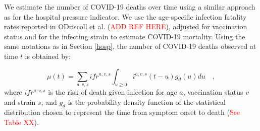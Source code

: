 We estimate the number of COVID-19 deaths over time using a similar approach 
as for the hospital pressure indicator. We use the age-specific infection fatality rates reported in
ODriscoll et al. (\textcolor{red}{ADD REF HERE}), adjusted for vaccination status and for the infecting strain
to estimate COVID-19 mortality. Using the same notations as in Section \ref{hosp}, the number of COVID-19
deaths observed at time $t$ is obtained by:

$$ \mu(t) = \sum_{a,v,s} ifr^{a,v,s} \int_{u \geq 0}  i^{a,v,s}(t-u)g_{d}(u) du   \quad, $$
where $ifr^{a,v,s}$ is the risk of death given infection for age $a$, vaccination status $v$ and strain $s$, 
and $g_d$ is the probability density function of the statistical distribution chosen to represent the 
time from symptom onset to death (\textcolor{red}{See Table XX}).